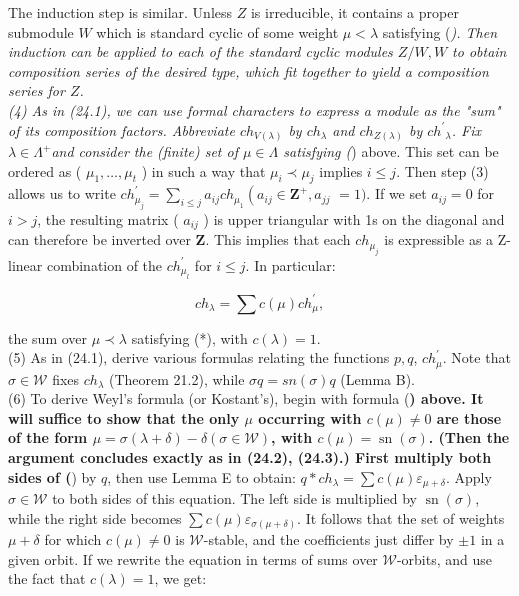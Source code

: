 \documentclass[10pt]{article}
\begin{document}
The induction step is similar. Unless $Z$ is irreducible, it contains a proper submodule $W$ which is standard cyclic of some weight $\mu<\lambda$ satisfying (\textit{). Then induction can be applied to each of the standard cyclic modules $Z / W, W$ to obtain composition series of the desired type, which fit together to yield a composition series for $Z$.\\
(4) As in (24.1), we can use formal characters to express a module as the "sum" of its composition factors. Abbreviate $c h_{V(\lambda)}$ by $c h_{\lambda}$ and $c h_{Z(\lambda)}$ by $c h^{\prime}{ }_{\lambda}$. Fix $\lambda \in \Lambda^{+}$and consider the (finite) set of $\mu \in \Lambda$ satisfying (}) above. This set can be ordered as ( $\mu_{1}, \ldots, \mu_{t}$ ) in such a way that $\mu_{i} \prec \mu_{j}$ implies $i \leq j$. Then step (3) allows us to write $c h_{\mu_{j}}^{\prime}=\sum_{i \leq j} a_{i j} c h_{\mu_{1}}\left(a_{i j} \in \mathbf{Z}^{+}, a_{j j}\right.$ $=1)$. If we set $a_{i j}=0$ for $i>j$, the resulting matrix ( $a_{i j}$ ) is upper triangular with 1s on the diagonal and can therefore be inverted over $\mathbf{Z}$. This implies that each $c h_{\mu_{j}}$ is expressible as a Z-linear combination of the $c h_{\mu_{l}}^{\prime}$ for $i \leq j$. In particular:


\begin{equation*}
c h_{\lambda}=\sum c(\mu) c h_{\mu}^{\prime}, \tag{**}
\end{equation*}


the sum over $\mu \prec \lambda$ satisfying (*), with $c(\lambda)=1$.\\
(5) As in (24.1), derive various formulas relating the functions $p, q$, $c h_{\mu}^{\prime}$. Note that $\sigma \in \mathscr{W}$ fixes $c h_{\lambda}$ (Theorem 21.2), while $\sigma q=s n(\sigma) q$ (Lemma B).\\
(6) To derive Weyl's formula (or Kostant's), begin with formula (\textbf{) above. It will suffice to show that the only $\mu$ occurring with $c(\mu) \neq 0$ are those of the form $\mu=\sigma(\lambda+\delta)-\delta(\sigma \in \mathscr{W})$, with $c(\mu)=\operatorname{sn}(\sigma)$. (Then the argument concludes exactly as in (24.2), (24.3).) First multiply both sides of (}) by $q$, then use Lemma E to obtain: $q * c h_{\lambda}=\sum c(\mu) \varepsilon_{\mu+\delta}$. Apply $\sigma \in \mathscr{W}$ to both sides of this equation. The left side is multiplied by $\operatorname{sn}(\sigma)$, while the right side becomes $\sum c(\mu) \varepsilon_{\sigma(\mu+\delta)}$. It follows that the set of weights $\mu+\delta$ for which $c(\mu) \neq 0$ is $\mathscr{W}$-stable, and the coefficients just differ by $\pm 1$ in a given orbit. If we rewrite the equation in terms of sums over $\mathscr{W}$-orbits, and use the fact that $c(\lambda)=1$, we get:
\end{document}
